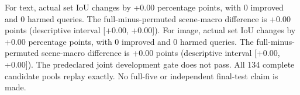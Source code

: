 For text, actual set IoU changes by +0.00 percentage points, with 0 improved and 0 harmed queries. The full-minus-permuted scene-macro difference is +0.00 points (descriptive interval [+0.00, +0.00]).
For image, actual set IoU changes by +0.00 percentage points, with 0 improved and 0 harmed queries. The full-minus-permuted scene-macro difference is +0.00 points (descriptive interval [+0.00, +0.00]).
The predeclared joint development gate does not pass. All 134 complete candidate pools replay exactly. No full-five or independent final-test claim is made.
